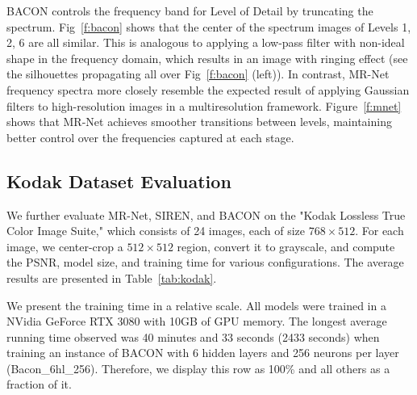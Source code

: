 BACON controls the frequency band for Level of Detail by truncating the spectrum. Fig~\ref{f:bacon} shows that the center of the spectrum images of Levels 1, 2, 6 are all similar. This is analogous to applying a low-pass filter with non-ideal shape in the frequency domain, which results in an image with ringing effect (see the silhouettes propagating all over Fig~\ref{f:bacon} (left)). In contrast, MR-Net frequency spectra more closely resemble the expected result of applying Gaussian filters to high-resolution images in a multiresolution framework. Figure~\ref{f:mnet} shows that MR-Net achieves smoother transitions between levels, maintaining better control over the frequencies captured at each stage.



\subsection{Kodak Dataset Evaluation}\label{sub:kodak}


We further evaluate MR-Net, SIREN, and BACON on the "Kodak Lossless True Color Image Suite," which consists of 24 images, each of size $768 \times 512$. For each image, we center-crop a $512 \times 512$ region, convert it to grayscale, and compute the PSNR, model size, and training time for various configurations. The average results are presented in Table~\ref{tab:kodak}.

We present the training time in a relative scale. All models were trained in a NVidia GeForce RTX 3080 with 10GB of GPU memory. The longest average running time observed was 40 minutes and 33 seconds (2433 seconds) when training an instance of BACON with 6 hidden layers and 256 neurons per layer (Bacon\_6hl\_256). Therefore, we display this row as 100\% and all others as a fraction of it.


